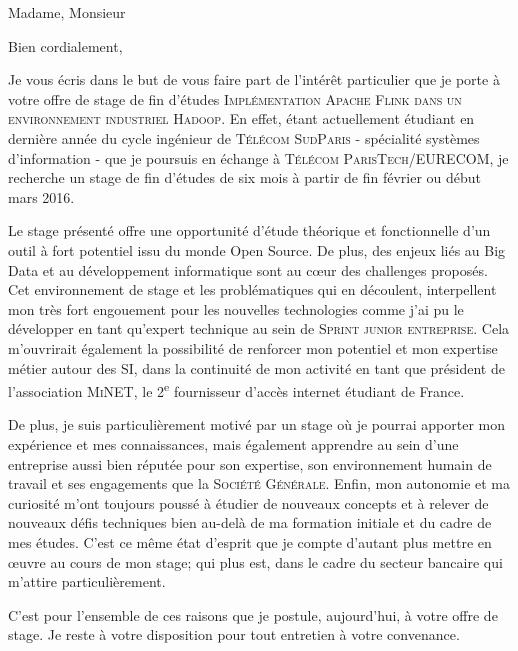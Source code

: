\documentclass[10pt,a4paper,roman]{moderncv} %
\begin{document}
\date{17 Novembre 2015} %
\opening{Madame, Monsieur} %

\closing{Bien cordialement,} %


\makelettertitle %


\quad \quad Je vous écris dans le but de vous faire part de l'intérêt particulier que je porte à votre offre de stage de fin d'études
\textsc{Implémentation Apache Flink dans un environnement industriel Hadoop}. En effet, étant actuellement étudiant en dernière année du cycle
ingénieur de \textsc{Télécom SudParis} - spécialité systèmes d'information - que je poursuis en échange à
\textsc{Télécom ParisTech}/\textsc{EURECOM}, je recherche un stage de fin d’études de six mois à partir de fin février ou début mars 2016.

\quad \quad Le stage présenté offre une opportunité d'étude théorique et fonctionnelle d'un outil à fort potentiel issu du monde Open Source.
De plus, des enjeux liés au Big Data et au développement informatique sont au c\oe ur des challenges proposés.
Cet environnement de stage et les problématiques qui en découlent, interpellent mon très fort engouement pour les nouvelles
technologies comme j'ai pu le développer en tant qu'expert technique au sein de \textsc{Sprint junior entreprise}.
Cela m'ouvrirait également la possibilité de renforcer mon potentiel et mon expertise métier autour des SI, dans la continuité de mon
activité en tant que président de l'association \textsc{MiNET}, le 2\textsuperscript{e} fournisseur d'accès internet étudiant de France.

\quad \quad De plus, je suis particulièrement motivé par un stage où je pourrai apporter mon expérience et mes connaissances, mais également
apprendre au sein d'une entreprise aussi bien réputée pour son expertise, son environnement humain de travail et ses engagements que la \textsc{Société Générale}.
Enfin, mon autonomie et ma curiosité m'ont toujours poussé à étudier de nouveaux concepts et à relever de nouveaux défis techniques bien au-delà de ma
formation initiale et du cadre de mes études. C'est ce même état d'esprit que je compte d'autant plus mettre en \oe uvre au cours de mon stage;
qui plus est, dans le cadre du secteur bancaire qui m'attire particulièrement.

\quad \quad C’est pour l’ensemble de ces raisons que je postule, aujourd'hui, à votre offre de stage. Je reste à votre disposition pour
tout entretien à votre convenance.
\\[0.7cm]


\makeletterclosing %

\end{document}
